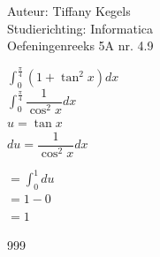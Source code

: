 \documentclass[a4paper]{article}
\begin{document}
  
\noindent \large Auteur: Tiffany Kegels \\
\noindent \large Studierichting: Informatica\\
\noindent \large Oefeningenreeks 5A nr. 4.9
\\

\medskip

\normalsize


$\displaystyle\int_{0}^{\tfrac{\pi}{4}} (1 + \tan^2 x) dx $\\

$\displaystyle\int_{0}^{\tfrac{\pi}{4}} \dfrac{1}{\cos^2 x} dx $\\

$u = \tan x$\\

$du = \dfrac{1}{\cos^2 x} dx$

$= \displaystyle\int_{0}^{1} du $\\

$= 1 - 0 $\\

$ = 1$\\

















\begin{thebibliography}{999}
\end{thebibliography}
\end{document}
